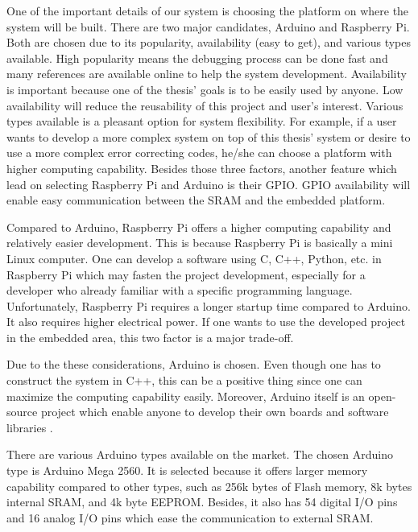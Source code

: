 One of the important details of our system is choosing the platform on where the system will be built.
There are two major candidates, Arduino and Raspberry Pi. Both are chosen due to its popularity, availability (easy to get), and various types available. High popularity means the debugging process can be done fast and many references are available online to help the system development. Availability is important because one of the thesis' goals is to be easily used by anyone. Low availability will reduce the reusability of this project and user's interest. Various types available is a pleasant option for system flexibility. For example, if a user wants to develop a more complex system on top of this thesis' system or desire to use a more complex error correcting codes, he/she can choose a platform with higher computing capability.
Besides those three factors, another feature which lead on selecting Raspberry Pi and Arduino is their GPIO. GPIO availability will enable easy communication between the SRAM and the embedded platform.

Compared to Arduino, Raspberry Pi offers a higher computing capability and relatively easier development. This is because Raspberry Pi is basically a mini Linux computer. One can develop a software using C, C++, Python, etc. in Raspberry Pi which may fasten the project development, especially for a developer who already familiar with a specific programming language. Unfortunately, Raspberry Pi requires a longer startup time compared to Arduino. It also requires higher electrical power. If one wants to use the developed project in the embedded area, this two factor is a major trade-off.

Due to the these considerations, Arduino is chosen. Even though one has to construct the system in C++, this can be a positive thing since one can maximize the computing capability easily. Moreover, Arduino itself is an open-source project which enable anyone to develop their own boards and software libraries \cite{arduino}.

There are various Arduino types available on the market. The chosen Arduino type is Arduino Mega 2560. It is selected because it offers larger memory capability compared to other types, such as 256k bytes of Flash memory, 8k bytes internal SRAM, and 4k byte EEPROM.
Besides, it also has 54 digital I/O pins and 16 analog I/O pins which ease the communication to external SRAM.

